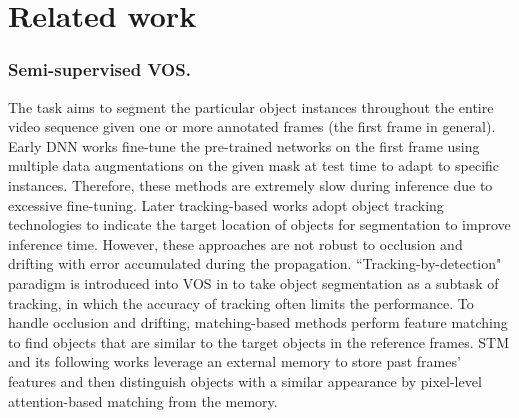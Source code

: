 \documentclass[runningheads]{llncs}
\begin{document}
\section{Related work}
\subsubsection{Semi-supervised VOS.} The task aims to segment the particular object instances throughout the entire video sequence given one or more annotated frames (the first frame in general). Early DNN works \cite{caelles2017one,perazzi2017learning,xiao2018monet} fine-tune the pre-trained networks on the first frame using multiple data augmentations on the given mask at test time to adapt to specific instances. Therefore, these methods are extremely slow during inference due to excessive fine-tuning.
Later tracking-based works \cite{wang2019fast,khoreva2019lucid,chen2020state} adopt object tracking technologies to indicate the target location of objects for segmentation to improve inference time. However, these approaches are not robust to occlusion and drifting with error accumulated during the propagation. ``Tracking-by-detection" paradigm is introduced into VOS in \cite{huang2020fast} to take object segmentation as a subtask of tracking, in which the accuracy of tracking often limits the performance. 
To handle occlusion and drifting, matching-based methods \cite{chen2018blazingly,voigtlaender2019feelvos} perform feature matching to find objects that are similar to the target objects in the reference frames. 
STM \cite{STM} and its following works \cite{seong2020kernelized,RMNet} leverage an external memory to store past frames' features and then distinguish objects with a similar appearance by pixel-level attention-based matching from the memory. 
\end{document}
